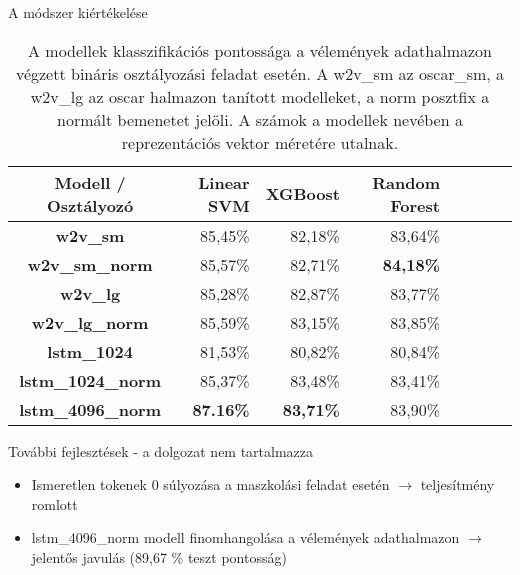 \documentclass{beamer}
\begin{document}
\begin{frame}{A módszer kiértékelése}
	
	\begin{table}
		\centering
		\begin{tabular}{ | c | r | r | r | r | r | r | r |}
			\hline
			\textbf{Modell / Osztályozó} & \textbf{Linear SVM} & \textbf{XGBoost} & \textbf{Random Forest} \\
			\hline \hline		
			\textbf{w2v\_sm} & 85,45\% & 82,18\% & 83,64\% \\
			\hline
			\textbf{w2v\_sm\_norm} & 85,57\% & 82,71\% & \textbf{84,18\%} \\
			\hline
			\textbf{w2v\_lg} & 85,28\% & 82,87\% & 83,77\% \\
			\hline
			\textbf{w2v\_lg\_norm} & 85,59\% & 83,15\% & 83,85\% \\
			\hline  
			\textbf{lstm\_1024} & 81,53\% & 80,82\% & 80,84\% \\
			\hline  
			\textbf{lstm\_1024\_norm} & 85,37\% & 83,48\% & 83,41\% \\
			\hline
			\textbf{lstm\_4096\_norm} & \textbf{87.16\%} & \textbf{83,71\%} & 83,90\% \\
			\hline
		\end{tabular}
		\caption{A modellek klasszifikációs pontossága a vélemények adathalmazon végzett bináris osztályozási feladat esetén. A w2v\_sm az oscar\_sm, a w2v\_lg az oscar halmazon tanított modelleket, a norm posztfix a normált bemenetet jelöli. A számok a modellek nevében a reprezentációs vektor méretére utalnak.}
	\end{table}
	
\end{frame}

\begin{frame}{További fejlesztések - a dolgozat nem tartalmazza}
	
\begin{itemize}
	\item Ismeretlen tokenek 0 súlyozása a maszkolási feladat esetén $\rightarrow$ teljesítmény romlott
	\item lstm\_4096\_norm modell finomhangolása a vélemények adathalmazon $\rightarrow$ jelentős javulás (89,67 \% teszt pontosság)
\end{itemize}
	
\end{frame}
\end{document}

